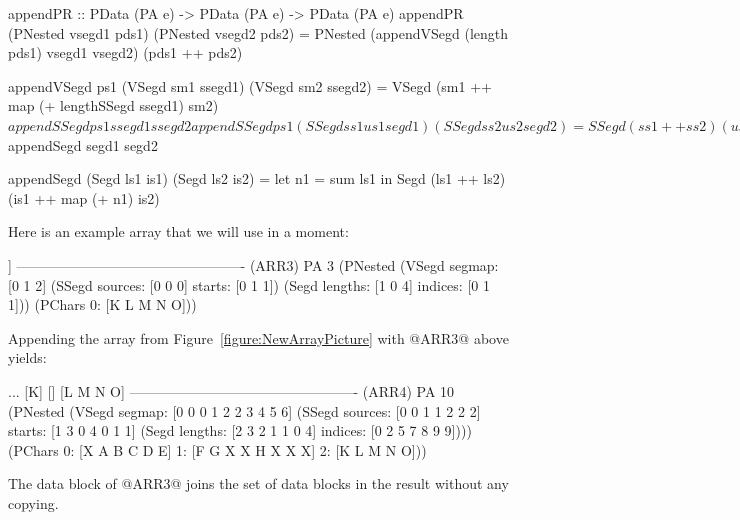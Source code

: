 \clearpage{}
\begin{small}
\begin{code}
appendPR :: PData (PA e) -> PData (PA e) -> PData (PA e)
appendPR (PNested vsegd1 pds1) (PNested vsegd2 pds2)
  = PNested (appendVSegd (length pds1) vsegd1 vsegd2)
            (pds1 ++ pds2) 

appendVSegd ps1 (VSegd sm1 ssegd1) (VSegd sm2 ssegd2)
  = VSegd (sm1 ++ map (+ lengthSSegd ssegd1) sm2)
  $ appendSSegd ps1 ssegd1 ssegd2

appendSSegd ps1 (SSegd ss1 us1 segd1) (SSegd ss2 us2 segd2)
  = SSegd (ss1 ++ ss2) (us1 ++ map (+ ps1) us2)
  $ appendSegd segd1 segd2

appendSegd (Segd ls1 is1) (Segd ls2 is2)
  = let n1 = sum ls1
    in  Segd  (ls1 ++ ls2) (is1 ++ map (+ n1) is2)
\end{code}
\end{small}
\noindent
Here is an example array that we will use in a moment:
\par
\begin{small}
\begin{code}
                 [[K] [] [L M N O]]
------------------------------------------------- (ARR3)
PA 3 (PNested
(VSegd  segmap: [0 1 2]
(SSegd sources: [0 0 0] starts:  [0 1 1])
(Segd  lengths: [1 0 4] indices: [0 1 1]))
(PChars 0: [K L M N O]))
\end{code}
\end{small}
\par
\noindent
Appending the array from Figure~\ref{figure:NewArrayPicture} with @ARR3@ above yields:
\par
\begin{small}
\begin{code}
   [[A B] [A B] [A B] [C D E] ...  [K] [] [L M N O]
------------------------------------------------- (ARR4)
PA 10 (PNested
(VSegd  segmap: [0 0 0 1 2 2 3 4 5 6]
(SSegd sources: [0 0 1 1 2 2 2]  starts: [1 3 0 4 0 1 1] 
(Segd  lengths: [2 3 2 1 1 0 4] indices: [0 2 5 7 8 9 9])))
(PChars 0: [X A B C D E] 
        1: [F G X X H X X X]
        2: [K L M N O]))
\end{code}
\end{small}
%
The data block of @ARR3@ joins the set of data blocks in the result without any copying.

